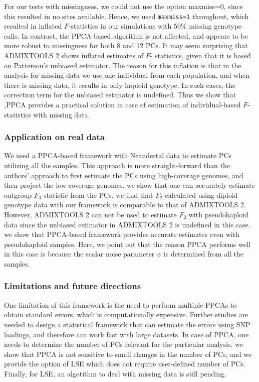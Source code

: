 \documentclass[12pt]{article}
\begin{document}
For our tests with missingness, we could not use the option maxmiss=0, since this resulted in no sites available. Hence, we used \texttt{maxmiss=1} throughout, which resulted in inflated $F$-statistics in our simulations with $50\%$ missing genotype calls. In contrast, the PPCA-based algorithm is not affected, and appears to be more robust to missingness for both 8 and 12 PCs. It may seem surprising that ADMIXTOOLS 2 shows inflated estimates of $F$- statistics, given that it is based on Patterson's unbiased estimator. The reason for this inflation is that in the analysis for missing data we use one individual from each population, and when there is missing data, it results in only haploid genotype. In such cases, the correction term for the unbiased estimator is undefined. Thus we show that ,PPCA provides a practical solution in case of estimation of individual-based $F$-statistics with missing data. 

\subsubsection{Application on real data}
We used a PPCA-based framework with Neandertal data to estimate PCs utilizing all the samples. This approach is more straight-forward than the authors' approach to first estimate the PCs using high-coverage genomes, and then project the low-coverage genomes. we show that one can accurately estimate outgroup $F_3$ statistic from the PCs. we find that $F_2$ calculated using diploid genotype data with our framework is comparable to that of ADMIXTOOLS 2. However, ADMIXTOOLS 2 can not be used to estimate $F_2$ with pseudohaploid data since the unbiased estimator in ADMIXTOOLS 2 is undefined in this case. we show that PPCA-based framework provides accurate estimates even with pseudohaploid samples. Here, we point out that the reason PPCA performs well in this case is because the scalar noise parameter $\psi$ is determined from all the samples.

\subsubsection{Limitations and future directions}
One limitation of this framework is the need to perform multiple PPCAs to obtain standard errors, which is computationally expensive. Further studies are needed to design a statistical framework that can estimate the errors using SNP loadings, and therefore can work fast with large datasets. In case of PPCA, one needs to determine the number of PCs relevant for the particular analysis. we show that PPCA is not sensitive to small changes in the number of PCs, and we provide the option of LSE which does not require user-defined number of PCs. Finally, for LSE, an algotithm to deal with missing data is still pending. 
\end{document}
